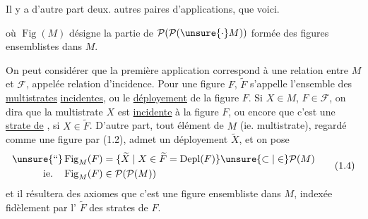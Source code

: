 Il y a d'autre part deux. autres paires d'applications, que voici.

où $\operatorname{Fig}(M)$ désigne la partie de $\mathcal P(\mathcal P(\unsure{\cdot}M))$ formée des figures ensemblistes dans $M$. 

On peut considérer que la première application correspond à une relation entre $M$ et $\mathcal F$, appelée relation d'incidence. Pour une figure $F$, $\widetilde F$ s'appelle l'ensemble des \uline{multistrates} \uline{incidentes}, ou le \uline{déployement} de la figure $F$. Si $X\in M$, $F\in\mathcal F$, on dira que la multistrate $X$ est \uline{incidente} à la figure $F$, ou encore que c'est une \uline{strate de} , si $X\in\widetilde F$. D'autre part, tout élément  de $M$ (ie.  multistrate), regardé comme une figure par (1.2), admet un déployement $\widetilde X$, et    on pose
\margin{$\unsure{\bullet|\cdot}$}
\begingroup\makeatletter\tagsleft@true\let\veqno\@@leqno\makeatother
\[
\begin{aligned}
\text{\unsure{``}}\operatorname{Fig}_{M}(F)&=\{\widetilde X\mid X\in\widetilde F=\operatorname{Depl}(F)\}\unsure{\subset|\in}\mathcal P(M)\\
\text{ie.}\quad \operatorname{Fig}_{M}(F)&\in\mathcal P(\mathcal P(M))
\end{aligned}\tag*{(1.4)}
\]
\endgroup
et il résultera des axiomes que c'est une figure ensembliste dans $M$, indexée fidèlement par l' $\widetilde F$ des strates de $F$.

